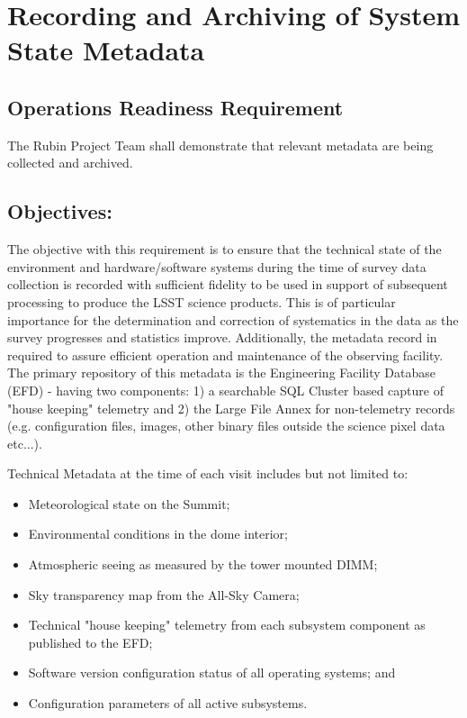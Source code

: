 \section{Recording and Archiving of System State Metadata}  \label{sec:metadata}

\subsection{Operations Readiness Requirement}

The Rubin Project Team shall demonstrate that relevant metadata are being collected and archived.

\subsection{Objectives:}

The objective with this requirement is to ensure that the technical state of the environment and hardware/software systems during the time of survey data collection is recorded with sufficient fidelity to be used in support of subsequent processing to produce the LSST science products. This is of particular importance for the determination and correction of systematics in the data as the survey progresses and statistics improve.  Additionally, the metadata record in required to assure efficient operation and maintenance of the observing facility.   The primary repository of this metadata is the Engineering Facility Database (EFD) - having two components: 1) a searchable SQL Cluster based capture of "house keeping" telemetry and 2) the Large File Annex for non-telemetry records (e.g. configuration files, images, other binary files outside the science pixel data etc...).

Technical Metadata at the time of each visit includes but not limited to:

\begin{itemize}

	\item Meteorological state on the Summit;
	\item Environmental conditions in the dome interior;
	\item Atmospheric seeing as measured by the tower mounted DIMM;
	\item Sky transparency map from the All-Sky Camera;
	\item Technical "house keeping" telemetry from each subsystem component as published to the EFD;
	\item Software version configuration status of all operating systems; and
	\item Configuration parameters of all active subsystems.
	
\end{itemize}

